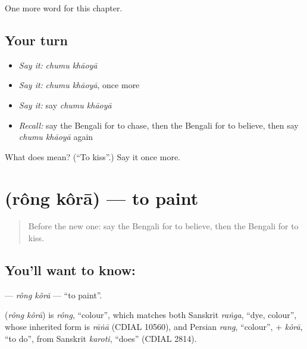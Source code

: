 \begin{grammarlens}[title={What you've built}]
One more word for this chapter.
\end{grammarlens}

\subsection*{Your turn}
\begin{itemize}
\raggedright
  \item \emph{Say it:} \emph{chumu khāoyā}
  \item \emph{Say it:} \emph{chumu khāoyā}, once more
  \item \emph{Say it:} say \emph{chumu khāoyā}
  \item \emph{Recall:} say the Bengali for to chase, then the Bengali for to believe, then say \emph{chumu khāoyā} again
\end{itemize}

\begin{tcolorbox}[breakable,colback=teal!4,colframe=teal!35!black,title={Before you move on}]
What does   mean? (\textquotedblleft{}To kiss\textquotedblright{}.) Say it once more.
\end{tcolorbox}
\section[\texorpdfstring{\bn{রং} \bn{করা} (rông kôrā)}{রং করা (rông kôrā)}]{  (rông kôrā) — to paint}

\label{lesson:BN-C239-rong-kora}



\begin{quote}
Before the new one: say the Bengali for to believe, then the Bengali for to kiss.
\end{quote}

\subsection*{You'll want to know:  }
\textbf{ } — \emph{rông kôrā} — \textquotedblleft{}to paint\textquotedblright{}.

\begin{cousinweb}
\textbf{ } (\emph{rông kôrā}) is \emph{rông}, \textquotedblleft{}colour\textquotedblright{}, which matches both Sanskrit \emph{raṅga}, \textquotedblleft{}dye, colour\textquotedblright{}, whose inherited form is \emph{rāṅā} (CDIAL 10560), and Persian \emph{rang}, \textquotedblleft{}colour\textquotedblright{}, + \emph{kôrā}, \textquotedblleft{}to do\textquotedblright{}, from Sanskrit \emph{karoti}, \textquotedblleft{}does\textquotedblright{} (CDIAL 2814).
\end{cousinweb}

